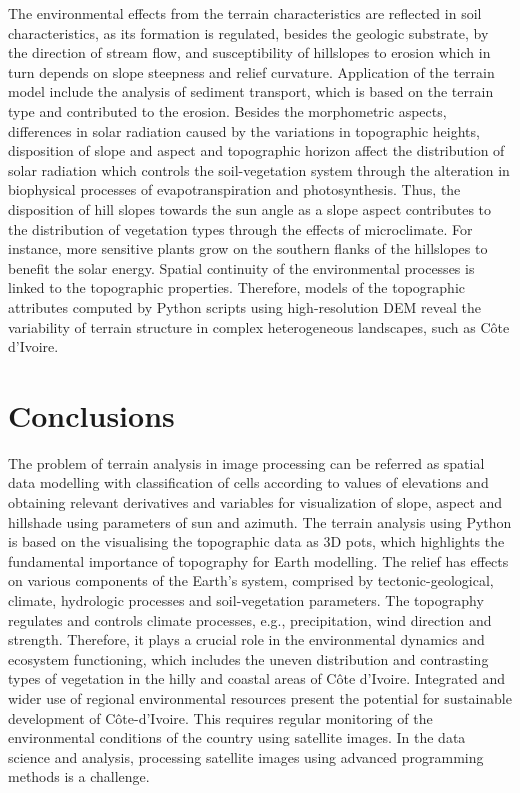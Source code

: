 \documentclass[ijgi,article,submit,pdftex,moreauthors]{Definitions/mdpi}
\begin{document}
The environmental effects from the terrain characteristics are reflected in soil characteristics, as its formation is regulated, besides the geologic substrate, by the direction of stream flow, and susceptibility of hillslopes to erosion which in turn depends on slope steepness and relief curvature. Application of the terrain model include the analysis of sediment transport, which is based on the terrain type and contributed to the erosion. Besides the morphometric aspects, differences in solar radiation caused by the variations in topographic heights, disposition of slope and aspect and topographic horizon affect the distribution of solar radiation which controls the soil-vegetation system through the alteration in biophysical processes of evapotranspiration and photosynthesis. Thus, the disposition of hill slopes towards the sun angle as a slope aspect contributes to the distribution of vegetation types through the effects of microclimate. For instance, more sensitive plants grow on the southern flanks of the hillslopes to benefit the solar energy. Spatial continuity of the environmental processes is linked to the topographic properties. Therefore, models of the topographic attributes computed by Python scripts using high-resolution DEM reveal the variability of terrain structure in complex heterogeneous landscapes, such as Côte d'Ivoire.

\section{Conclusions}
The problem of terrain analysis in image processing can be referred as spatial data modelling with classification of cells according to values of elevations and obtaining relevant derivatives and variables for visualization of slope, aspect and hillshade using parameters of sun and azimuth. The terrain analysis using Python is based on the visualising the topographic data as 3D pots, which highlights the fundamental importance of topography for Earth modelling. The relief has effects on various components of the Earth’s system, comprised by tectonic-geological, climate, hydrologic processes and soil-vegetation parameters. The topography regulates and controls climate processes, e.g., precipitation, wind direction and strength. Therefore, it plays a crucial role in the environmental dynamics and ecosystem functioning, which includes the uneven distribution and contrasting types of vegetation in the hilly and coastal areas of Côte d'Ivoire. Integrated and wider use of regional environmental resources present the potential for sustainable development of Côte-d'Ivoire. This requires regular monitoring of the environmental conditions of the country using satellite images. In the data science and analysis, processing satellite images using advanced programming methods is a challenge. 
\end{document}
